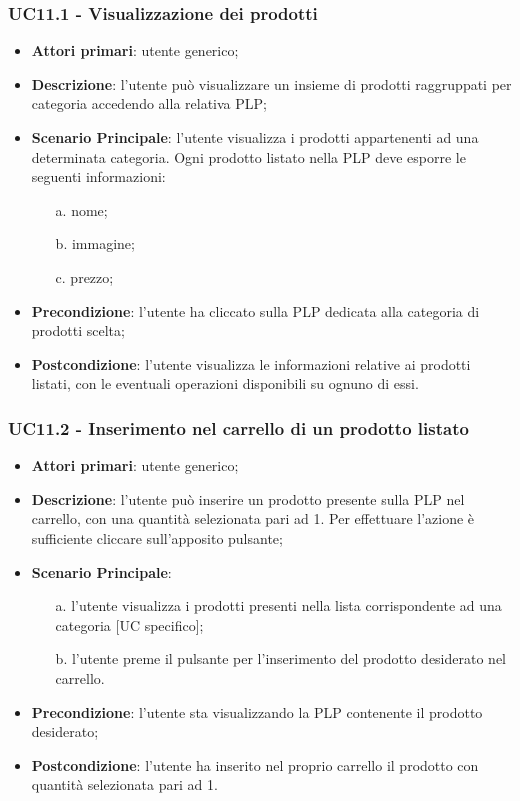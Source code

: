 \subsubsection{UC11.1 - Visualizzazione dei prodotti}
\begin{itemize}
\item \textbf{Attori primari}: utente generico;
\item \textbf{Descrizione}: l'utente può visualizzare un insieme di prodotti raggruppati per categoria accedendo alla relativa PLP;
\item \textbf{Scenario Principale}: l'utente visualizza i prodotti appartenenti ad una determinata categoria. Ogni prodotto listato nella PLP deve esporre le seguenti informazioni:
\begin{enumerate}
\item[a.] nome;
\item[b.] immagine;
\item[c.] prezzo;
\end{enumerate}
\item \textbf{Precondizione}: l'utente ha cliccato sulla PLP dedicata alla categoria di prodotti scelta;
\item \textbf{Postcondizione}: l'utente visualizza le informazioni relative ai prodotti listati, con le eventuali operazioni disponibili su ognuno di essi.
\end{itemize}
\subsubsection{UC11.2 - Inserimento nel carrello di un prodotto listato}
\begin{itemize}
\item \textbf{Attori primari}: utente generico;
\item \textbf{Descrizione}: l'utente può inserire un prodotto presente sulla PLP nel carrello, con una quantità selezionata pari ad 1. Per effettuare l'azione è sufficiente cliccare sull'apposito pulsante;
\item \textbf{Scenario Principale}:
\begin{enumerate}
\item[a.] l'utente visualizza i prodotti presenti nella lista corrispondente ad una categoria [UC specifico];
\item[b.] l'utente preme il pulsante per l'inserimento del prodotto desiderato nel carrello.
\end{enumerate}
\item \textbf{Precondizione}: l'utente sta visualizzando la PLP contenente il prodotto desiderato;
\item \textbf{Postcondizione}: l'utente ha inserito nel proprio carrello il prodotto con quantità selezionata pari ad 1.
\end{itemize}
